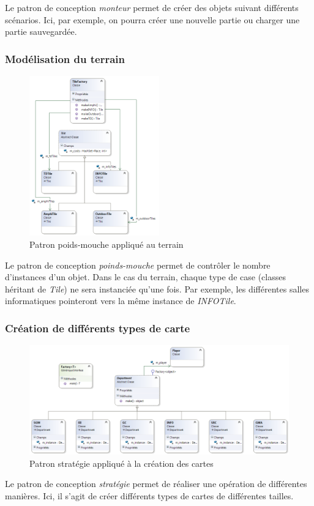 Le patron de conception \emph{monteur} permet de créer des objets suivant différents scénarios.
Ici, par exemple, on pourra créer une nouvelle partie ou charger une partie sauvegardée.

\subsubsection{Modélisation du terrain} %

\begin{figure}[!h]
\centering
\includegraphics[width=0.5\textwidth]{Parties/Images/UML_Tiles.png}
\caption{Patron poids-mouche appliqué au terrain}
\label{fig:uml_tiles}
\end{figure}

Le patron de conception \emph{poinds-mouche} permet de contrôler le nombre d'instances d'un objet.
Dans le cas du terrain, chaque type de case (classes héritant de \emph{Tile}) ne sera instanciée qu'une fois.
Par exemple, les différentes salles informatiques pointeront vers la même instance de \emph{INFOTile}.

\subsubsection{Création de différents types de carte} %

\begin{figure}[!h]
\centering
\includegraphics[width=\textwidth]{Parties/Images/UML_Dept.png}
\caption{Patron stratégie appliqué à la création des cartes}
\label{fig:uml_board}
\end{figure}

Le patron de conception \emph{stratégie} permet de réaliser une opération de différentes manières.
Ici, il s'agit de créer différents types de cartes de différentes tailles.
